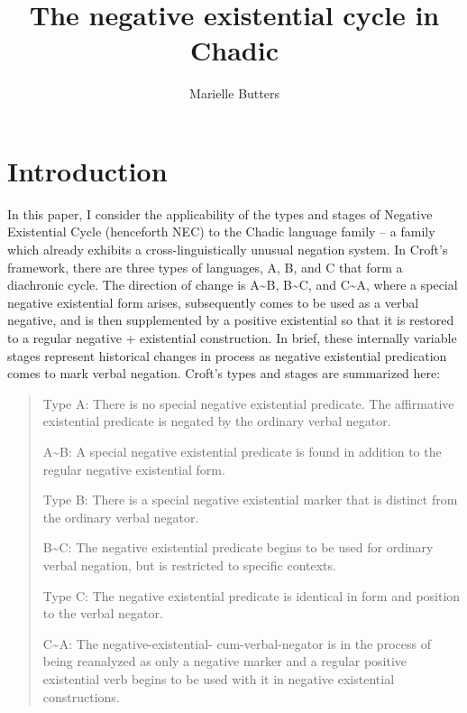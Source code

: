 \documentclass[output=paper]{langsci/langscibook}
\author{Marielle Butters\affiliation{University of Colorado at Boulder}}
\title{The negative existential cycle in Chadic}
\begin{document}
\section{Introduction}\label{sec:3:1}

In this paper, I consider the applicability of the types and stages of  Negative Existential Cycle (henceforth NEC) to the Chadic language family -- a family which already exhibits a cross-linguistically unusual negation system. In Croft's framework, there are three types of languages, A, B, and C that form a diachronic cycle. The direction of change is A{\textasciitilde}B, B{\textasciitilde}C, and C{\textasciitilde}A, where a special negative existential form arises, subsequently comes to be used as a verbal negative, and is then supplemented by a positive existential so that it is restored to a regular negative + existential construction. In brief, these internally variable stages represent historical changes in process as negative existential predication comes to mark verbal negation. Croft's types and stages are summarized here:
\begin{quote}
\begin{description}\begin{small}
\item{Type A:} There is no special negative existential predicate. The affirmative existential predicate is negated by the ordinary verbal negator.
\item{A{\textasciitilde}B:} A special negative existential predicate is found in addition to the regular negative existential form. 
\item{Type B:} There is a special negative existential marker that is distinct from the ordinary verbal negator. 
\item{B{\textasciitilde}C:} The negative existential predicate begins to be
used for ordinary verbal negation, but is restricted to specific contexts. 
\item{Type C:} The negative existential predicate is identical in form and position to the verbal negator.
\item{C{\textasciitilde}A:} The negative-existential- cum-verbal-negator is in the process of being reanalyzed as only a negative marker and a regular positive existential verb begins to be used with it in negative existential constructions.
\end{small}
\end{description}
\end{quote}
\end{document}
